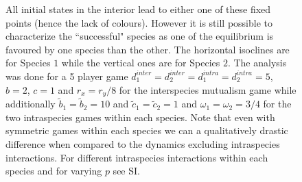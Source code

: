 \documentclass{pnastwo}
\begin{document}
\begin{article}
\begin{figure}[h]
\begin{center}
{{All initial states in the interior lead to either one of these fixed points (hence the lack of colours).
However it is still possible to characterize the ``successful" species as one of the equilibrium is favoured by one species than the other.
The horizontal isoclines are for Species $1$ while the vertical ones are for Species $2$.
The analysis was done for a 5 player game $d_1^{inter} = d_2^{inter} = d_1^{intra} = d_2^{intra} = 5$, $b=2$, $c=1$ and $r_x = r_y /8$ for the interspecies mutualism game while additionally $\tilde{b}_1 = \tilde{b}_2 = 10$ and $\tilde{c}_1 = \tilde{c}_2 = 1$ and $\omega_1 = \omega_2 = 3/4$ for the two intraspecies games within each species. Note that even with symmetric games within each species we can a qualitatively drastic difference when compared to the dynamics excluding intraspecies interactions.  For different intraspecies interactions within each species and for varying $p$ see SI.}
}
\end{center}
\end{figure}






\end{article}
\end{document}
